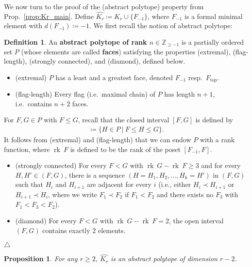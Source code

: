 \documentclass[11pt]{amsart}
\newtheorem{proposition}[theorem]{Proposition}
\theoremstyle{definition}
\newtheorem{definition}[theorem]{Definition}
\theoremstyle{remark}
\theoremstyle{plain}
\newcommand{\bZ}{\mathbb{Z}}
\newcommand{\on}{\operatorname}
\newcommand{\rk}{{\on{rk}\:}}
\renewcommand{\top}{{\on{top}}}
\newcommand{\wh}{\widehat}
\begin{document}

We now turn to the proof of the {\sc(abstract polytope)} property from Prop.~\ref{prop:Kr_main}.
Define $\wh{K_r} \coloneqq K_r \cup \{F_{-1}\}$, where $F_{-1}$ is a formal minimal element with $d(F_{-1}) \coloneqq -1$.
We first recall the notion of abstract polytope:
\begin{definition}
\label{def:abstract_polytope}
An {\bf{abstract polytope of rank $n \in \bZ_{\geq -1}$}} is a partially ordered set $P$ (whose elements are called {\bf{faces}}) satisfying the properties {\sc (extremal)}, {\sc (flag-length)}, {\sc (strongly connected)}, and {\sc (diamond)}, defined below.
\begin{itemize}
\item[] {\sc (extremal)} $P$ has a least and a greatest face, denoted $F_{-1}$ resp.\ $F_\top$.

\item[] {\sc (flag-length)} Every flag (i.e.\ maximal chain) of $P$ has length $n+1$, i.e.\ contains $n+2$ faces.
\end{itemize}
For $F, G \in P$ with $F \leq G$, recall that the closed interval $[F,G]$ is defined by
\begin{align}
[F,G] \coloneqq \{H \in P \:|\: F \leq H \leq G\}.	
\end{align}
It follows from {\sc (extremal)} and {\sc (flag-length)} that we can endow $P$ with a rank function, where $\rk F$ is defined to be the rank of the poset $[F_{-1},F]$.
\begin{itemize}
\item[] {\sc (strongly connected)} For every $F < G$ with $\rk G - \rk F \geq 3$ and for every $H, H' \in (F,G)$, there is a sequence $(H = H_1, H_2, \ldots, H_k = H')$ in $(F,G)$ such that $H_i$ and $H_{i+1}$ are adjacent for every $i$ (i.e., either $H_i \prec H_{i+1}$ or $H_{i+1} \prec H_i$, where we write $F_1 \prec F_2$ if $F_1 < F_2$ and there exists no $F_3$ with $F_1 < F_3 < F_2$).

\item[] {\sc (diamond)} For every $F < G$ with $\rk G - \rk F = 2$, the open interval $(F,G)$ contains exactly 2 elements.
\end{itemize}
\null\hfill$\triangle$
\end{definition}

\begin{proposition}
\label{prop:Kr_polytope}
For any $r \geq 2$, $\wh{K_r}$ is an abstract polytope of dimension $r-2$.	
\end{proposition}
\end{document}
